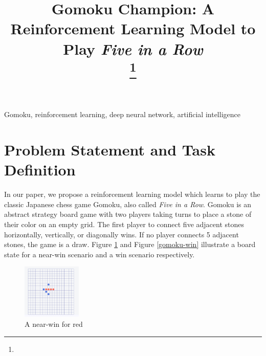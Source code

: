 \documentclass[conference]{IEEEtran}
\begin{document}
\title{Gomoku Champion: A Reinforcement Learning Model to Play \textit{Five in a Row}\\
{}
\thanks{}
}

\author{
\and
{}
}

\maketitle

\begin{IEEEkeywords}
Gomoku, reinforcement learning, deep neural network, artificial intelligence
\end{IEEEkeywords}

\section{Problem Statement and Task Definition}
 In our paper, we propose a reinforcement learning model which learns to play the classic Japanese chess game Gomoku, also called \textit{Five in a Row}. Gomoku is an abstract strategy board game with two players taking turns to place a stone of their color on an empty grid. The first player to connect five adjacent stones horizontally, vertically, or diagonally wins. If no player connects 5 adjacent stones, the game is a draw. Figure \ref{gomoku-near-win} and Figure \ref{gomoku-win} illustrate a board state for a near-win scenario and a win scenario respectively.
 
 \begin{figure}[h]
    \centering
    \includegraphics[width=0.25\textwidth]{images/gomoku-nearwin.png}
    \caption{A near-win for red}
    \label{gomoku-near-win}
\end{figure}
\end{document}

